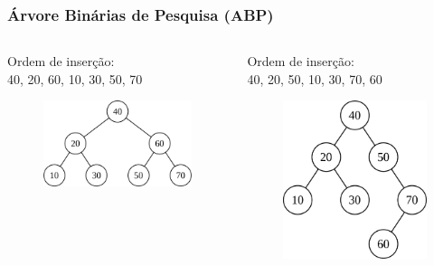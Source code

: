 \documentclass[aspectratio=169]{beamer}
\begin{document}
\begin{frame}\frametitle{Árvore Binárias de Pesquisa (ABP)}
\begin{columns}[T]
\begin{column}{0.25\linewidth}
\scriptsize{Ordem de inserção:\\
40, 20, 60, 10, 30, 50, 70}
\begin{figure}[h]
	\centering
	\includegraphics[height=0.2\paperheight]{imagens/avl02.png}
\end{figure}
\end{column}
\begin{column}{0.25\linewidth}
\scriptsize{Ordem de inserção:\\
40, 20, 50, 10, 30, 70, 60}
\begin{figure}[h]
	\centering
	\includegraphics[height=0.3\paperheight]{imagens/avl03.png}

\end{figure}
\end{column}
\end{columns}
\end{frame}
\end{document}
